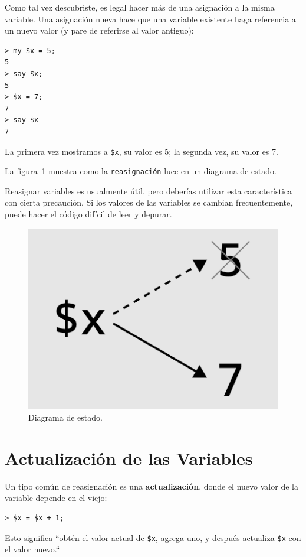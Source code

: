 Como tal vez descubriste, es legal hacer más de una asignación a la 
misma variable. Una asignación nueva hace que una variable existente
haga referencia a un nuevo valor (y pare de referirse al valor antiguo):

\begin{lstlisting}
> my $x = 5;
5
> say $x;
5
> $x = 7;
7
> say $x
7
\end{lstlisting}
%
La primera vez mostramos a {\tt \$x},
su valor es 5; la segunda vez, su valor es 7.

La figura~\ref{fig.assign2} muestra como la {\tt reasignación}
luce en un diagrama de estado. 
 

Reasignar variables es usualmente útil, pero deberías utilizar esta
característica con cierta precaución. Si los valores de las variables 
se cambian frecuentemente, puede hacer el código difícil de leer y depurar.

\begin{figure}
\centerline
{\includegraphics[scale=0.5]{figs/reassignment.pdf}}
\caption{Diagrama de estado.}
\label{fig.assign2}
\end{figure}



\section{Actualización de las Variables}
\label{update}


Un tipo común de reasignación es una {\bf actualización},
donde el nuevo valor de la variable depende en el viejo:

\begin{lstlisting}
> $x = $x + 1;
\end{lstlisting}
%
Esto significa ``obtén el valor actual de {\tt \$x}, agrega uno, y después
actualiza {\tt \$x} con el valor nuevo.``

